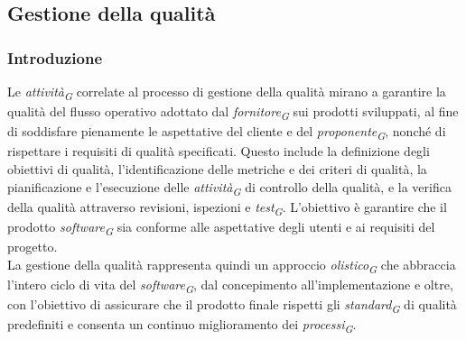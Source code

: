 \subsection{Gestione della qualità}
\subsubsection{Introduzione}
Le \textit{attività}\textsubscript{\textit{G}} correlate al processo di gestione della qualità mirano a garantire la qualità del flusso operativo adottato dal \textit{fornitore}\textsubscript{\textit{G}} sui prodotti sviluppati, al fine di soddisfare pienamente le aspettative del cliente e del \textit{proponente}\textsubscript{\textit{G}}, nonché di rispettare i requisiti di qualità specificati. Questo include la definizione degli obiettivi di qualità, l'identificazione delle metriche e dei criteri di qualità, la pianificazione e l'esecuzione delle \textit{attività}\textsubscript{\textit{G}} di controllo della qualità, e la verifica della qualità attraverso revisioni, ispezioni e \textit{test}\textsubscript{\textit{G}}. L'obiettivo è garantire che il prodotto \textit{software}\textsubscript{\textit{G}} sia conforme alle aspettative degli utenti e ai requisiti del progetto. \\
La gestione della qualità rappresenta quindi un approccio \textit{olistico}\textsubscript{\textit{G}} che abbraccia l'intero ciclo di vita del \textit{software}\textsubscript{\textit{G}}, dal concepimento all'implementazione e oltre, con l'obiettivo di assicurare che il prodotto finale rispetti gli \textit{standard}\textsubscript{\textit{G}} di qualità predefiniti e consenta un continuo miglioramento dei \textit{processi}\textsubscript{\textit{G}}.

